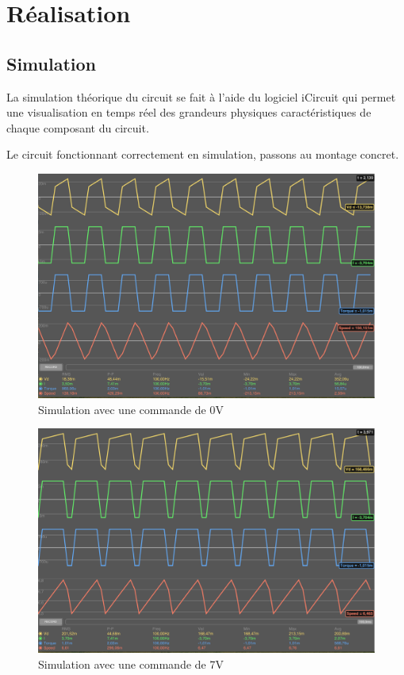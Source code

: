 \documentclass[a4paper]{article}
\begin{document}
\section{Réalisation}

\subsection{Simulation}

La simulation théorique du circuit se fait à l'aide du logiciel iCircuit qui permet une visualisation en temps réel des grandeurs physiques caractéristiques de chaque composant du circuit.

Le circuit fonctionnant correctement en simulation, passons au montage concret.

\begin{figure}[H]
	\centering
	\includegraphics[width=1\textwidth]{simu0v}
	\caption{Simulation avec une commande de 0V}
\end{figure}
\begin{figure}[H]
	\centering
	\includegraphics[width=1\textwidth]{simu7v}
	\caption{Simulation avec une commande de 7V}
\end{figure}
\end{document}
